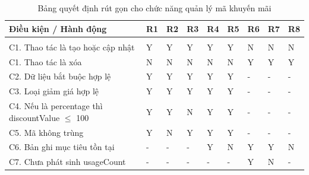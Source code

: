 \begin{table}[H]
	\centering
	\caption{Bảng quyết định rút gọn cho chức năng quản lý mã khuyến mãi}
	\footnotesize
	\renewcommand{\arraystretch}{1.25}
	\setlength{\tabcolsep}{3pt}
	\begin{tabular}{|>{\raggedright\arraybackslash}p{5.3cm}|>{\centering\arraybackslash}m{0.72cm}|>{\centering\arraybackslash}m{0.72cm}|>{\centering\arraybackslash}m{0.72cm}|>{\centering\arraybackslash}m{0.72cm}|>{\centering\arraybackslash}m{0.72cm}|>{\centering\arraybackslash}m{0.72cm}|>{\centering\arraybackslash}m{0.72cm}|>{\centering\arraybackslash}m{0.72cm}|}
		\hline
		\textbf{Điều kiện / Hành động}                     & \textbf{R1} & \textbf{R2} & \textbf{R3} & \textbf{R4} & \textbf{R5} & \textbf{R6} & \textbf{R7} & \textbf{R8} \\
		\hline
		\multicolumn{9}{|l|}{\textbf{Nhóm điều kiện}}                                                                                                                      \\
		\hline
		C1. Thao tác là tạo hoặc cập nhật                  & Y           & Y           & Y           & Y           & Y           & N           & N           & N           \\
		\hline
		C1. Thao tác là xóa                                & N           & N           & N           & N           & N           & Y           & Y           & Y           \\
		\hline
		C2. Dữ liệu bắt buộc hợp lệ                        & Y           & Y           & Y           & Y           & Y           & -           & -           & -           \\
		\hline
		C3. Loại giảm giá hợp lệ                           & Y           & Y           & Y           & Y           & Y           & -           & -           & -           \\
		\hline
		C4. Nếu là percentage thì discountValue $\leq$ 100 & Y           & Y           & N           & Y           & Y           & -           & -           & -           \\
		\hline
		C5. Mã không trùng                                 & Y           & N           & Y           & Y           & Y           & -           & -           & -           \\
		\hline
		C6. Bản ghi mục tiêu tồn tại                       & -           & -           & -           & Y           & N           & Y           & Y           & N           \\
		\hline
		C7. Chưa phát sinh usageCount                      & -           & -           & -           & -           & -           & Y           & N           & -           \\

\end{tabular}
\end{table}
